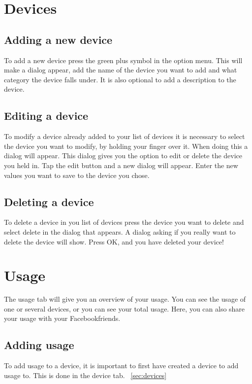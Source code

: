 \label{sec:devices}
\section{Devices}
\subsection{Adding a new device}
To add a new device press the green plus symbol in the option menu. This will make a dialog appear, add the name of the device you want to add and what category the device falls under. It is also optional to add a description to the device.


\subsection{Editing a device}
To modify a device already added to your list of devices it is necessary to select the device you want to modify, by holding your finger over it. When doing this a dialog will appear. This dialog gives you the option to edit or delete the device you held in. Tap the edit button and a new dialog will appear. Enter the new values you want to save to the device you chose.


\subsection{Deleting a device}
To delete a device in you list of devices press the device you want to delete and select delete in the dialog that appears. A dialog asking if you really want to delete the device will show. Press OK, and you have deleted your device!


\section{Usage}
The usage tab will give you an overview of your usage. You can see the usage of one or several devices, or you can see your total usage. Here, you can also share your usage with your Facebookfriends.
\subsection{Adding usage}
To add usage to a device, it is important to first have created a device to add usage to. This is done in the device tab. ~\ref{sec:devices}
